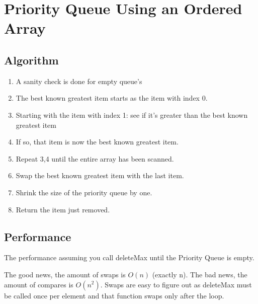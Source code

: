 \documentclass[12pt]{amsart}
\begin{document}
\section{Priority Queue Using an Ordered Array}
    \subsection{Algorithm}
    \begin{enumerate}
        \item
            A sanity check is done for empty queue's
         \item
             The best known greatest item starts as the item with index 0.
         \item
             Starting with the item with index 1: see if it's greater than the best known greatest item
         \item
             If so, that item is now the best known greatest item.
         \item
             Repeat 3,4 until the entire array has been scanned.
         \item
             Swap the best known greatest item with the last item.
         \item
             Shrink the size of the priority queue by one.
         \item
             Return the item just removed.
    \end{enumerate}

    \subsection{Performance}
    
    The performance assuming you call deleteMax until the Priority Queue is empty.
    
    The good news, the amount of swaps is $O(n)$ (exactly n). The bad news, the amount of compares is $O(n^2)
$. 
    Swaps are easy to figure out as deleteMax must be called once per element and that function swaps only after the loop. \\
\end{document}
